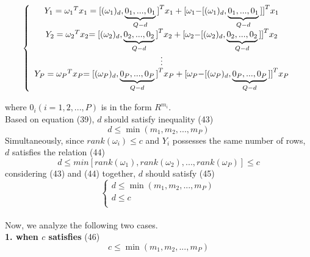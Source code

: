 \documentclass[journal]{IEEEtran}
\begin{document}
\begin{small}
\begin{equation}
\left\{ {\begin{array}{*{20}{c}}
   {{Y_1} = {\omega _1}^T{x_1} = {{{\rm{[(}}{\omega _1}{)_d},\underbrace {{0_1},...,{0_1}}_{Q - d}{\rm{]}}}^T}{x_1} + {{{\rm{[}}{\omega _1}{\rm{ - [(}}{\omega _1}{)_d},\underbrace {{0_1},...,{0_1}}_{Q - d}{\rm{]]}}}^T}{x_1}}  \\
   {{Y_2} = {\omega _2}^T{x_2}{\rm{ = [(}}{\omega _2}{)_d},\underbrace {{0_2},...,{0_2}}_{Q - d}{{\rm{]}}^T}{x_2} + {{{\rm{[}}{\omega _2}{\rm{ - [(}}{\omega _2}{)_d},\underbrace {{0_2},...,{0_2}}_{Q - d}{\rm{]]}}}^T}{x_2}}  \\
    \vdots   \\
   {{Y_P} = {\omega _P}^T{x_P}{\rm{ = [(}}{\omega _P}{)_d},\underbrace {{0_P},...,{0_P}}_{Q - d}{{\rm{]}}^T}{x_P} + {{{\rm{[}}{\omega _P}{\rm{ - [(}}{\omega _P}{)_d},\underbrace {{0_P},...,{0_P}}_{Q - d}{\rm{]]}}}^T}{x_P}}  \\
\end{array}} \right.
\end{equation}
\end{small}
where ${0_i}(i = 1,2,...,P)$ is in the form ${R^{{m_i}}}$.\\\indent
Based on equation (39), $d$ should satisfy inequality (43)
\begin{equation}
d \le \min ({m_1},{m_2},...,{m_P})
\end{equation}
Simultaneously, since $rank({\omega _i}) \le c$ and ${Y_i}$ possesses the same number of rows, $d$ satisfies the relation (44)                                                                                                      \begin{equation}
d \le min[rank({\omega _1}),rank({\omega _2}),...,rank({\omega _P})] \le c
\end{equation}
considering (43) and (44) together, $d$ should satisfy (45)
\begin{equation}
\left\{ \begin{array}{l}
 d \le \min ({m_1},{m_2},...,{m_P}) \\
 d \le c \\
 \end{array} \right.
\end{equation}\\\indent
Now, we analyze the following two cases.\\
\textbf{1. when $c$ satisfies} (46)
\begin{equation}
c \le \min ({m_1},{m_2},...,{m_P})
 \end{equation}
\end{document}
